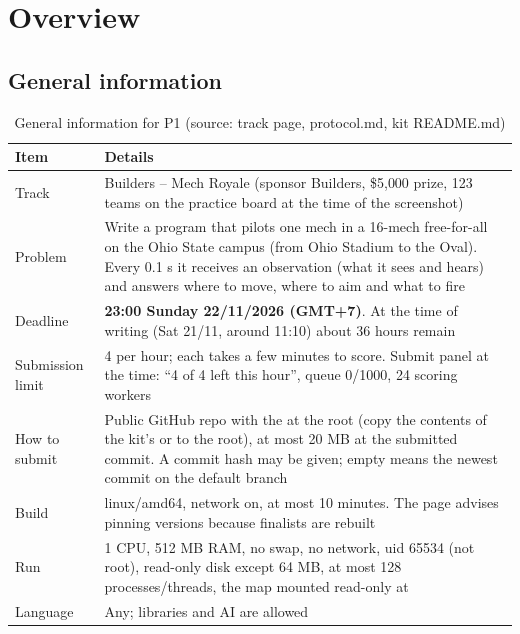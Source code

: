 \documentclass[a4paper,12pt]{article}
\newcommand{\src}[1]{{\footnotesize\textcolor{p7}{(source: #1)}}}
\newcommand{\fn}[1]{\texttt{\detokenize{#1}}}
\begin{document}
\thispagestyle{fancy}
\newpage
\tableofcontents
\newpage

\sloppy

\section{Overview}

\subsection{General information}
\begin{table}[H]
\centering\small
\begin{tabularx}{\textwidth}{L{4.0cm}Y}
\toprule
\textbf{Item} & \textbf{Details} \\
\midrule
Track & Builders -- Mech Royale (sponsor Builders, \$5{,}000 prize, 123 teams on the practice board at the time of the screenshot) \\
Problem & Write a program that pilots one mech in a 16-mech free-for-all on the Ohio State campus (from Ohio Stadium to the Oval). Every 0.1 s it receives an observation (what it sees and hears) and answers where to move, where to aim and what to fire \\
Deadline & \textbf{23:00 Sunday 22/11/2026 (GMT+7)}. At the time of writing (Sat 21/11, around 11:10) about 36 hours remain \\
Submission limit & 4 per hour; each takes a few minutes to score. Submit panel at the time: ``4 of 4 left this hour'', queue 0/1000, 24 scoring workers \\
How to submit & Public GitHub repo with the \fn{Dockerfile} at the root (copy the contents of the kit's \fn{python/} or \fn{ts/} to the root), at most 20 MB at the submitted commit. A commit hash may be given; empty means the newest commit on the default branch \\
Build & linux/amd64, network on, at most 10 minutes. The page advises pinning versions because finalists are rebuilt \\
Run & 1 CPU, 512 MB RAM, no swap, no network, uid 65534 (not root), read-only disk except \fn{/tmp} 64 MB, at most 128 processes/threads, the map mounted read-only at \fn{/arena} \\
Language & Any; libraries and AI are allowed \\
\bottomrule
\end{tabularx}
\caption{General information for P1 \src{track page, protocol.md, kit README.md}}
\end{table}
\end{document}
